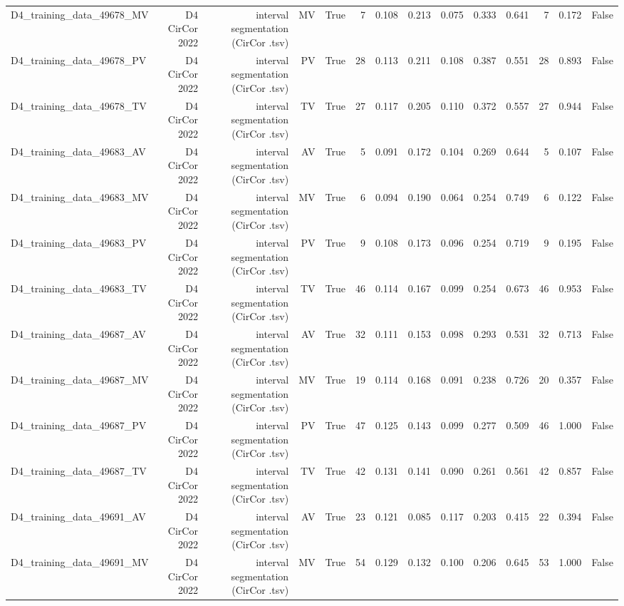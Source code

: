 \begin{table}[htbp]
\begin{tabular}{lrrrrrrrrrrrrr}
    D4\_training\_data\_49678\_MV & D4 CirCor 2022 & interval segmentation (CirCor .tsv) & MV & True & 7 & 0.108 & 0.213 & 0.075 & 0.333 & 0.641 & 7 & 0.172 & False \\
    D4\_training\_data\_49678\_PV & D4 CirCor 2022 & interval segmentation (CirCor .tsv) & PV & True & 28 & 0.113 & 0.211 & 0.108 & 0.387 & 0.551 & 28 & 0.893 & False \\
    D4\_training\_data\_49678\_TV & D4 CirCor 2022 & interval segmentation (CirCor .tsv) & TV & True & 27 & 0.117 & 0.205 & 0.110 & 0.372 & 0.557 & 27 & 0.944 & False \\
    D4\_training\_data\_49683\_AV & D4 CirCor 2022 & interval segmentation (CirCor .tsv) & AV & True & 5 & 0.091 & 0.172 & 0.104 & 0.269 & 0.644 & 5 & 0.107 & False \\
    D4\_training\_data\_49683\_MV & D4 CirCor 2022 & interval segmentation (CirCor .tsv) & MV & True & 6 & 0.094 & 0.190 & 0.064 & 0.254 & 0.749 & 6 & 0.122 & False \\
    D4\_training\_data\_49683\_PV & D4 CirCor 2022 & interval segmentation (CirCor .tsv) & PV & True & 9 & 0.108 & 0.173 & 0.096 & 0.254 & 0.719 & 9 & 0.195 & False \\
    D4\_training\_data\_49683\_TV & D4 CirCor 2022 & interval segmentation (CirCor .tsv) & TV & True & 46 & 0.114 & 0.167 & 0.099 & 0.254 & 0.673 & 46 & 0.953 & False \\
    D4\_training\_data\_49687\_AV & D4 CirCor 2022 & interval segmentation (CirCor .tsv) & AV & True & 32 & 0.111 & 0.153 & 0.098 & 0.293 & 0.531 & 32 & 0.713 & False \\
    D4\_training\_data\_49687\_MV & D4 CirCor 2022 & interval segmentation (CirCor .tsv) & MV & True & 19 & 0.114 & 0.168 & 0.091 & 0.238 & 0.726 & 20 & 0.357 & False \\
    D4\_training\_data\_49687\_PV & D4 CirCor 2022 & interval segmentation (CirCor .tsv) & PV & True & 47 & 0.125 & 0.143 & 0.099 & 0.277 & 0.509 & 46 & 1.000 & False \\
    D4\_training\_data\_49687\_TV & D4 CirCor 2022 & interval segmentation (CirCor .tsv) & TV & True & 42 & 0.131 & 0.141 & 0.090 & 0.261 & 0.561 & 42 & 0.857 & False \\
    D4\_training\_data\_49691\_AV & D4 CirCor 2022 & interval segmentation (CirCor .tsv) & AV & True & 23 & 0.121 & 0.085 & 0.117 & 0.203 & 0.415 & 22 & 0.394 & False \\
    D4\_training\_data\_49691\_MV & D4 CirCor 2022 & interval segmentation (CirCor .tsv) & MV & True & 54 & 0.129 & 0.132 & 0.100 & 0.206 & 0.645 & 53 & 1.000 & False \\

\end{tabular}
\end{table}
